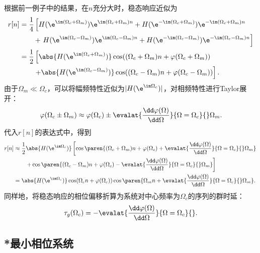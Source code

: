 \begin{example}
    根据前一例子中的结果，在$n$充分大时，稳态响应近似为
    \begin{align}
        r[n]&=\frac{1}{4}\left[H(\e^{\im(\Omega_c+\Omega_m)})\e^{\im(\Omega_c+\Omega_m)n}+H(\e^{-\im(\Omega_c+\Omega_m)})\e^{-\im(\Omega_c+\Omega_m)n}\right. \nonumber \\
        &\qquad+\left.H(\e^{\im(\Omega_c-\Omega_m)})\e^{\im(\Omega_c-\Omega_m)n}+H(\e^{-\im(\Omega_c-\Omega_m)})\e^{-\im(\Omega_c-\Omega_m)n}\right] \nonumber \\
        &=\frac12\left[\abs{H(\e^{\im(\Omega_c+\Omega_m)})}\cos((\Omega_c+\Omega_m)n+\varphi(\Omega_c+\Omega_m))\right. \nonumber \\
        &\qquad\left.+\abs{H(\e^{\im(\Omega_c-\Omega_m)})}\cos((\Omega_c-\Omega_m)n+\varphi(\Omega_c-\Omega_m))\right].
    \end{align}
    由于$\Omega_m\ll\Omega_c$，可以将幅频特性近似为$|H(\e^{\im\Omega_c})|$，对相频特性进行Taylor展开：
    \begin{equation}
        \varphi(\Omega_c\pm\Omega_m)\approx \varphi(\Omega_c)\pm \evalat{\frac{\dd\varphi(\Omega)}{\dd\Omega}}{\Omega=\Omega_c}{}\Omega_m.
    \end{equation}
    代入$r[n]$的表达式中，得到
    \begin{align}
        r[n]&\approx \frac{1}{2}\abs{H(\e^{\im\Omega_c})}\left[\cos\paren{(\Omega_c+\Omega_m)n+\varphi(\Omega_c)+\evalat{\frac{\dd\varphi(\Omega)}{\dd\Omega}}{\Omega=\Omega_c}{}\Omega_m}\right. \nonumber \\
        &\qquad\left.+\cos\paren{(\Omega_c-\Omega_m)n+\varphi(\Omega_c)-\evalat{\frac{\dd\varphi(\Omega)}{\dd\Omega}}{\Omega=\Omega_c}{}\Omega_m}\right] \nonumber \\
        &=\abs{H(\e^{\im\Omega_c})}\cos(\Omega_c n+\varphi(\Omega_c))\cos\paren{\Omega_m n+\evalat{\frac{\dd\varphi(\Omega)}{\dd\Omega}}{\Omega=\Omega_c}{}\Omega_m}.
    \end{align}
    同样地，将稳态响应的相位偏移折算为系统对中心频率为$\Omega_c$的序列的群时延：
    \begin{equation}
        \tau_g(\Omega_c)=-\evalat{\frac{\dd\varphi(\Omega)}{\dd\Omega}}{\Omega=\Omega_c}{}.
    \end{equation}
\end{example}

\subsection{*最小相位系统}\label{sub:minimum_phase}

